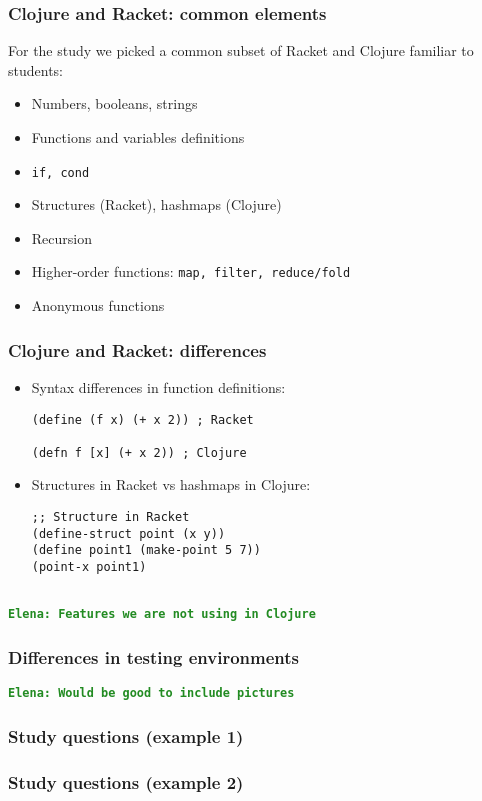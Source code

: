 \documentclass{beamer}
\newcommand{\comment}[1]{{\bf \tt  {#1}}}
\newcommand{\emcomment}[1]{\textcolor{ForestGreen}{\comment{Elena: {#1}}}}
\begin{document}
\begin{frame}
\frametitle{ Clojure and Racket: common elements}
For the study we picked a common subset of Racket and Clojure familiar to students:
\begin{itemize}
\item Numbers, booleans, strings 
\item Functions and variables definitions
\item {\tt if, cond}
\item Structures (Racket), hashmaps (Clojure)
\item Recursion
\item Higher-order functions: {\tt map, filter, reduce/fold}
\item Anonymous functions
\end{itemize}
\end{frame}

\begin{frame}[fragile]
\frametitle{ Clojure and Racket:  differences}
\begin{itemize}
\item Syntax differences in function definitions:
\begin{verbatim}
(define (f x) (+ x 2)) ; Racket

(defn f [x] (+ x 2)) ; Clojure
\end{verbatim}
\item Structures in Racket vs hashmaps in Clojure:
\begin{verbatim}
;; Structure in Racket
(define-struct point (x y))
(define point1 (make-point 5 7))
(point-x point1)


\end{verbatim}
\end{itemize}
\emcomment{Features we are not using in  Clojure}
\end{frame}

\begin{frame}
\frametitle{ Differences in testing environments}
\emcomment{Would be good to include pictures}
\end{frame}

\begin{frame}
\frametitle{Study questions (example 1)}

\end{frame}

\begin{frame}
\frametitle{Study questions (example 2)}

\end{frame}
\end{document}
